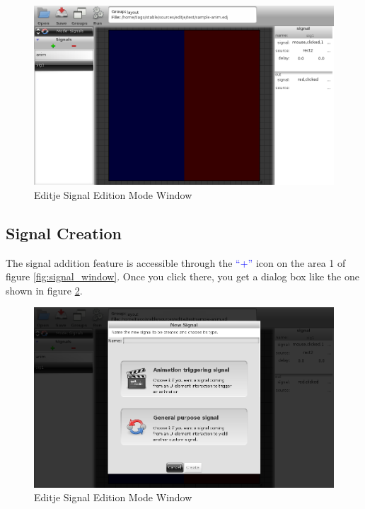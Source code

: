 \documentclass[a4paper]{profusion}
\newcommand{\GUIIcon}[1]{\textcolor{blue}{#1}}    %
\begin{document}
\begin{figure}
 \centering
 \includegraphics[width=1.0\textwidth]{./images/signal_list.png}
 \caption{Editje Signal Edition Mode Window}
 \label{fig:signal_window_list}
\end{figure}

\subsection{Signal Creation}

The signal addition feature is accessible through the \GUIIcon{``+''}
icon on the area 1 of figure \ref{fig:signal_window}. Once you click
there, you get a dialog box like the one shown in figure
\ref{fig:signal_window_new}.

\begin{figure}
 \centering
 \includegraphics[width=1.0\textwidth]{./images/signal_new.png}
 \caption{Editje Signal Edition Mode Window}
 \label{fig:signal_window_new}
\end{figure}
\end{document}
